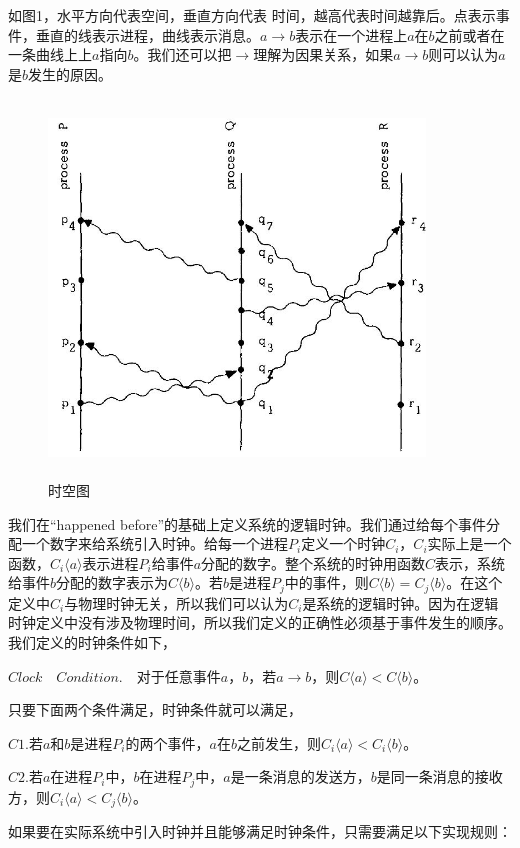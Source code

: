 \documentclass[UTF8]{article}
\begin{document}
	如图1，水平方向代表空间，垂直方向代表	时间，越高代表时间越靠后。点表示事件，垂直的线表示进程，曲线表示消息。$a \to b$表示在一个进程上$a$在$b$之前或者在一条曲线上上$a$指向$b$。我们还可以把$\to$理解为因果关系，如果$a \to b$则可以认为$a$是$b$发生的原因。
\begin{figure}[H]
\centering
\small
\includegraphics[width=10cm,height=10cm]{1.JPG}
\caption{时空图}
\end{figure}
	
	我们在“happened before”的基础上定义系统的逻辑时钟。我们通过给每个事件分配一个数字来给系统引入时钟。给每一个进程$P_i$定义一个时钟$C_i$，$C_i$实际上是一个函数，$C_i \langle a \rangle$表示进程$P_i$给事件$a$分配的数字。整个系统的时钟用函数$C$表示，系统给事件$b$分配的数字表示为$C \langle b \rangle$。若$b$是进程$P_j$中的事件，则$C\langle b\rangle =C_j\langle b\rangle$。在这个定义中$C_i$与物理时钟无关，所以我们可以认为$C_i$是系统的逻辑时钟。因为在逻辑时钟定义中没有涉及物理时间，所以我们定义的正确性必须基于事件发生的顺序。我们定义的时钟条件如下，
	
	$Clock \quad Condition. \quad$对于任意事件$a$，$b$，若$a \to b$，则$C \langle a \rangle < C \langle b \rangle$。
	
	只要下面两个条件满足，时钟条件就可以满足，
	
	$C1$.若$a$和$b$是进程$P_i$的两个事件，$a$在$b$之前发生，则$C_i \langle a \rangle < C_i \langle b \rangle$。

	$C2$.若$a$在进程$P_i$中，$b$在进程$P_j$中，$a$是一条消息的发送方，$b$是同一条消息的接收方，则$C_i \langle a \rangle < C_j \langle b \rangle$。

	如果要在实际系统中引入时钟并且能够满足时钟条件，只需要满足以下实现规则：
\end{document}
